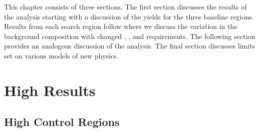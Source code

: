 This chapter consists of three sections. The first section discusses the
results of the \hpt analysis starting with a discussion of the yields for the
three baseline regions. Results from each search region follow where we discuss
the variation in the background composition with changed \njets, \nbtags, \Ht
and \met requirements. The following section provides an analogous discussion
of the \lpt analysis. The final section discusses limits set on various models
of new physics.

\section{High \pt Results}
\label {sec:results_hpt}

\subsection{High \pt Control Regions}
\label {sec:results_hpt_bl}


